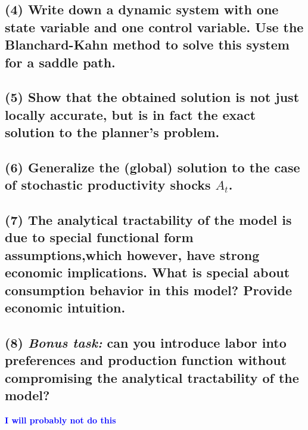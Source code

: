 \documentclass[]{article}
\newcommand{\fix} [1] {\textbf{\textcolor{blue}{#1}}} %
\begin{document}
\subsection*{(4) Write down a dynamic system with one state variable and one control variable. Use the Blanchard-Kahn method to solve this system for a saddle path.}


\subsection*{(5) Show that the obtained solution is not just locally accurate, but is in fact the exact solution to the planner’s problem.}


\subsection*{(6) Generalize the (global) solution to the case of stochastic productivity shocks $A_t$.}


\subsection*{(7) The analytical tractability of the model is due to special functional form assumptions,which however, have strong economic implications. What is special about consumption behavior in this model? Provide economic intuition.}


\subsection*{(8) \textit{Bonus task:} can you introduce labor into preferences and production function without compromising the analytical tractability of the model?}
\fix{I will probably not do this} 
\end{document}
